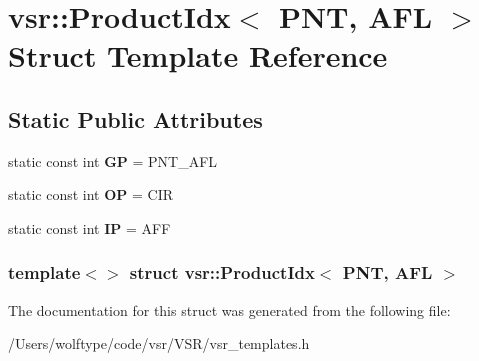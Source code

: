 \hypertarget{structvsr_1_1_product_idx_3_01_p_n_t_00_01_a_f_l_01_4}{\section{vsr\-:\-:Product\-Idx$<$ P\-N\-T, A\-F\-L $>$ Struct Template Reference}
\label{structvsr_1_1_product_idx_3_01_p_n_t_00_01_a_f_l_01_4}
}
\subsection*{Static Public Attributes}
\begin{DoxyCompactItemize}
\item 
\hypertarget{structvsr_1_1_product_idx_3_01_p_n_t_00_01_a_f_l_01_4_af804ba832a20b75d6ae430c3dabcb33e}{static const int {\bfseries G\-P} = P\-N\-T\-\_\-\-A\-F\-L}\label{structvsr_1_1_product_idx_3_01_p_n_t_00_01_a_f_l_01_4_af804ba832a20b75d6ae430c3dabcb33e}

\item 
\hypertarget{structvsr_1_1_product_idx_3_01_p_n_t_00_01_a_f_l_01_4_afe75ff3bab14cce9a9d4ba10acb22808}{static const int {\bfseries O\-P} = C\-I\-R}\label{structvsr_1_1_product_idx_3_01_p_n_t_00_01_a_f_l_01_4_afe75ff3bab14cce9a9d4ba10acb22808}

\item 
\hypertarget{structvsr_1_1_product_idx_3_01_p_n_t_00_01_a_f_l_01_4_a1872a901f73d9f70dee7a2555777fcc1}{static const int {\bfseries I\-P} = A\-F\-F}\label{structvsr_1_1_product_idx_3_01_p_n_t_00_01_a_f_l_01_4_a1872a901f73d9f70dee7a2555777fcc1}

\end{DoxyCompactItemize}
\subsubsection*{template$<$$>$ struct vsr\-::\-Product\-Idx$<$ P\-N\-T, A\-F\-L $>$}



The documentation for this struct was generated from the following file\-:\begin{DoxyCompactItemize}
\item 
/\-Users/wolftype/code/vsr/\-V\-S\-R/vsr\-\_\-templates.\-h\end{DoxyCompactItemize}
